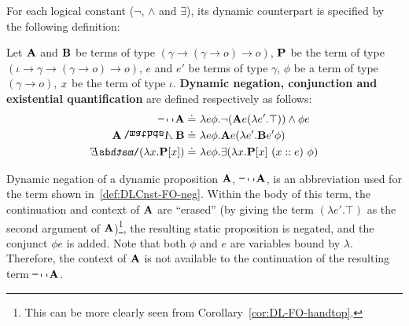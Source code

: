 For each logical constant ($\neg$, $\land$ and $\exists$), its dynamic counterpart is specified by the following definition: 
\begin{definition} \label{def:DLCnst-FO} Let $\A2$ and $\B2$ be terms of type $(\gamma \rightarrow (\gamma \rightarrow o) \rightarrow o)$, $\P2$ be the term of type $(\iota \rightarrow \gamma \rightarrow (\gamma \rightarrow o) \rightarrow o)$, $e$ and  $e'$ be terms of type $\gamma$, $\phi$ be a term of type $(\gamma \rightarrow o)$, $\x1$ be the term of type $\iota$. \textbf{Dynamic negation, conjunction and existential quantification} are defined respectively as follows:
\begin{subequations}
\begin{align}
\n2 \A2 \defeq \ & \lambda e \phi. \neg (\A2 e (\lambda e'. \top) ) \land \phi e  \label{def:DLCnst-FO-neg} \\
\A2 \cnj2 \B2 \defeq \ & \lambda e\phi. \A2 e (\lambda e'. \B2 e' \phi) \label{def:DLCnst-FO-cnj} \\
\ex2 ( \lambda \x1. \P2[\x1]) \defeq \ & \lambda e \phi. \exists ( \lambda \x1. \P2 [\x1] \ (x::e) \ \phi )\label{def:DLCnst-FO-ex} 
\end{align}
\end{subequations}
\end{definition}
Dynamic negation of a dynamic proposition $\A2$, $\n2 \A2$, is an abbreviation used for the term shown in~\eqref{def:DLCnst-FO-neg}. Within the body of this term, the continuation and context of $\A2$ are ``erased'' (by giving the term $(\lambda e'. \top)$ as the second argument of $\A2$)\footnote{This can be more clearly seen from Corollary~\ref{cor:DL-FO-handtop}.}, the resulting static proposition is negated, and the conjunct $\phi e$ is added. Note that both $\phi$ and $e$ are variables bound by $\lambda$. Therefore, the context of $\A2$ is not available to the continuation of the resulting term $\n2 \A2$. %
